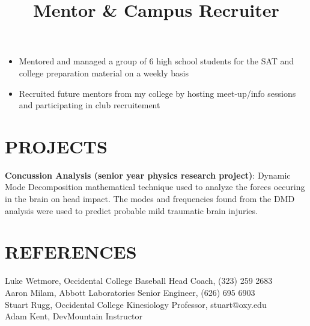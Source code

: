 \documentclass[margin]{res}
\begin{document}
\begin{resume}
\title{\textbf{Mentor \& Campus Recruiter}}
\begin{position}
    \begin{itemize}
        \item Mentored and managed a group of 6 high school students for the SAT and college preparation material on a weekly basis
        \item Recruited future mentors from my college by hosting meet-up/info sessions and participating in club recruitement
    \end{itemize}
\end{position}


\section{PROJECTS}
\par
\textbf{Concussion Analysis (senior year physics research project)}: 
Dynamic Mode Decomposition mathematical technique used to analyze the forces occuring in the brain on head impact. The modes and frequencies found from the DMD analysis were used to predict probable mild traumatic brain injuries.

\section{REFERENCES}
Luke Wetmore, Occidental College Baseball Head Coach, (323) 259 2683 \\
Aaron Milam, Abbott Laboratories Senior Engineer, (626) 695 6903 \\
Stuart Rugg, Occidental College Kinesiology Professor, stuart@oxy.edu\\
Adam Kent, DevMountain Instructor
\end{resume}
\end{document}
